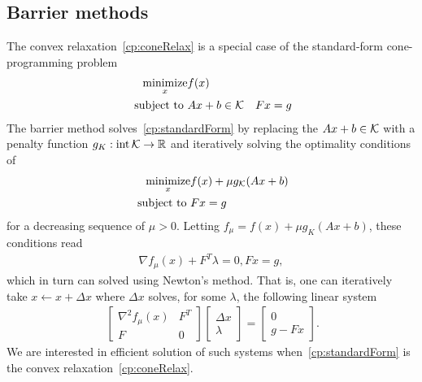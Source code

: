 \documentclass[letterpaper, 11pt]{article}
\begin{document}
\subsection{Barrier methods}
The convex relaxation~\eqref{cp:coneRelax} is a special case of the standard-form cone-programming problem
\begin{align}~\label{cp:standardForm}
  \begin{aligned}
    \operatorname*{minimize}_{x} &   f(x)\\
    \mbox{subject to } & Ax + b \in \mathcal{K}
                       & Fx = g
  \end{aligned}
\end{align}
The barrier method solves~\eqref{cp:standardForm} by
replacing the $Ax + b \in \mathcal{K}$ with a penalty function  
$g_K : \operatorname*{int} \mathcal{K} \rightarrow \mathbb{R}$ and iteratively solving the optimality conditions of
\begin{align}~\label{qp:barrier}
  \begin{aligned}
    \operatorname*{minimize}_{x} &   f(x) + \mu g_{\mathcal{K}}(Ax+b) \\
    \mbox{subject to } 
                       & Fx = g
  \end{aligned}
\end{align}
for a decreasing sequence of $\mu > 0$.  
Letting $f_{\mu} = f(x) + \mu  g_K(Ax+b)$, these conditions read
\begin{align}\label{eq:barrier}
  \nabla f_{\mu}(x)+ F^T \lambda = 0, Fx = g,
\end{align}
which in turn can solved using  Newton's method. That is, one can iteratively take
$x \leftarrow x + \Delta x$ where $\Delta x$ solves, for some $\lambda$, the following linear system 
\begin{align}~\label{eq:kktsystem}
  \begin{bmatrix}
    \nabla^2 f_\mu(x)  & F^T  \\
    F  & 0 
  \end{bmatrix}
  \begin{bmatrix}
    \Delta x\\
    \lambda
  \end{bmatrix}
=
  \begin{bmatrix}
    0\\
   g - Fx
  \end{bmatrix}.
\end{align}
We are interested in efficient solution of such systems
when~\eqref{cp:standardForm} is the convex relaxation~\eqref{cp:coneRelax}.
\end{document}
